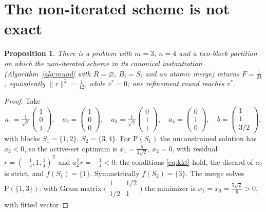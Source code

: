 \documentclass[pdflatex,sn-mathphys-num]{sn-jnl}
\theoremstyle{thmstyleone}
\newtheorem{proposition}{Proposition}
\theoremstyle{thmstyletwo}
\newcommand{\T}{{\mathsf T}}
\newcommand{\prob}[1]{\mathrm{P}(#1)}
\begin{document}
\section{The non-iterated scheme is not exact}\label{sec:counter}

\begin{proposition}\label{prop:counter}
There is a problem with $m=3$, $n=4$ and a two-block partition on which
the non-iterated scheme in its canonical instantiation
(Algorithm~\ref{alg:round} with $R=\varnothing$, $B_i=S_i$ and an atomic
merge) returns $F=\tfrac1{24}$, equivalently
$\lVert r\rVert^2=\tfrac1{12}$, while $v^*=0$; one refinement round
reaches $v^*$.
\end{proposition}
\begin{proof}
Take
\begin{equation*}
a_1=\tfrac1{\sqrt2}\!\begin{pmatrix}1\\0\\1\end{pmatrix}\!,\quad
a_2=\begin{pmatrix}1\\0\\0\end{pmatrix}\!,\quad
a_3=\tfrac1{\sqrt2}\!\begin{pmatrix}0\\1\\1\end{pmatrix}\!,\quad
a_4=\begin{pmatrix}0\\1\\0\end{pmatrix}\!,\quad
b=\begin{pmatrix}1\\1\\3/2\end{pmatrix}\!,
\end{equation*}
with blocks $S_1=\{1,2\}$, $S_2=\{3,4\}$. For $\prob{S_1}$ the
unconstrained solution has $x_2<0$, so the active-set optimum is
$x_1=\tfrac{5}{2\sqrt2}$, $x_2=0$, with residual
$r=(-\tfrac14,1,\tfrac14)^{\T}$ and $a_2^{\T}r=-\tfrac14<0$: the
conditions \eqref{eq:kkt} hold, the discard of $a_2$ is strict, and
$f(S_1)=\{1\}$. Symmetrically $f(S_2)=\{3\}$. The merge solves
$\prob{\{1,3\}}$: with Gram matrix
$\bigl(\begin{smallmatrix}1&1/2\\1/2&1\end{smallmatrix}\bigr)$ the
minimizer is $x_1=x_3=\tfrac{5\sqrt2}{6}>0$, with fitted vector

\end{proof}
\end{document}
